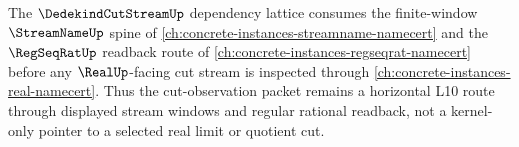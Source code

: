 The $\DedekindCutStreamUp$ dependency lattice consumes the finite-window
$\StreamNameUp$ spine of \autoref{ch:concrete-instances-streamname-namecert}
and the $\RegSeqRatUp$ readback route of
\autoref{ch:concrete-instances-regseqrat-namecert} before any
$\RealUp$-facing cut stream is inspected through
\autoref{ch:concrete-instances-real-namecert}. Thus the cut-observation packet
remains a horizontal L10 route through displayed stream windows and regular
rational readback, not a kernel-only pointer to a selected real limit or
quotient cut.
